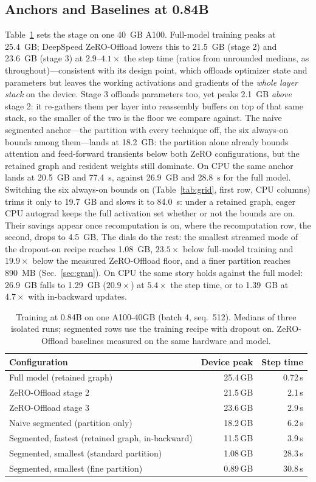 \documentclass[journal]{IEEEtran}
\begin{document}
\subsection{Anchors and Baselines at 0.84B}\label{sec:anchors}
Table~\ref{tab:compare} sets the stage on one 40~GB A100. Full-model
training peaks at 25.4~GB; DeepSpeed ZeRO-Offload lowers this to 21.5~GB
(stage 2) and 23.6~GB (stage 3) at $2.9$--$4.1\times$ the step
time (ratios from unrounded medians, as throughout)---consistent with its design point, which offloads optimizer state and
parameters but leaves the working activations and gradients of the
\emph{whole layer stack} on the device. Stage 3 offloads parameters too, yet
peaks 2.1~GB \emph{above} stage 2: it re-gathers them per layer into
reassembly buffers on top of that same stack, so the smaller of the two is the
floor we compare against. The naive segmented anchor---the
partition with every technique off, the six always-on bounds among them---lands at 18.2~GB: the partition alone already bounds attention
and feed-forward transients below both ZeRO configurations, but the
retained graph and resident weights still dominate. On CPU the same anchor
lands at 20.5~GB and 77.4~s, against 26.9~GB and 28.8~s for the full
model. Switching the six always-on bounds on (Table~\ref{tab:grid}, first
row, CPU columns) trims it only to 19.7~GB and slows it to 84.0~s: under
a retained graph, eager CPU autograd keeps the full activation set
whether or not the bounds are on. Their savings appear once recomputation
is on, where the recomputation row, the second, drops to 4.5~GB. The dials do the
rest: the smallest streamed mode of the dropout-on recipe reaches 1.08~GB, $23.5\times$ below
full-model training and $19.9\times$ below the measured ZeRO-Offload floor,
and a finer partition reaches 890~MB (Sec.~\ref{sec:gran}). On CPU the same
story holds against the full model: 26.9~GB falls to 1.29~GB
($20.9\times$) at $5.4\times$ the step time, or to 1.39~GB at $4.7\times$
with in-backward updates.

\begin{table}[t]
\caption{Training at 0.84B on one A100-40GB (batch 4, seq.\ 512). Medians
of three isolated runs; segmented rows use the training recipe with
dropout on. ZeRO-Offload baselines measured on the same hardware
and model.}
\label{tab:compare}
\centering
\begin{tabular}{@{}lrr@{}}
\toprule
Configuration & Device peak & Step time \\
\midrule
Full model (retained graph) & 25.4\,GB & 0.72\,s \\
ZeRO-Offload stage 2 & 21.5\,GB & 2.1\,s \\
ZeRO-Offload stage 3 & 23.6\,GB & 2.9\,s \\
Naive segmented (partition only) & 18.2\,GB & 6.2\,s \\
Segmented, fastest (retained graph, in-backward) & 11.5\,GB & 3.9\,s \\
Segmented, smallest (standard partition) & 1.08\,GB & 28.3\,s \\
Segmented, smallest (fine partition) & 0.89\,GB & 30.8\,s \\
\bottomrule
\end{tabular}
\end{table}
\end{document}
